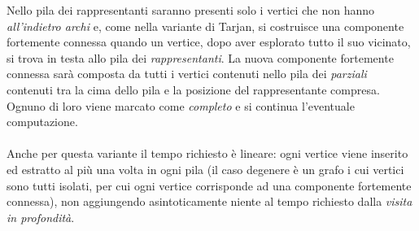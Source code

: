 Nello pila dei rappresentanti saranno presenti solo i vertici che non
hanno \emph{all'indietro archi} e, come nella variante di Tarjan, si
costruisce una componente fortemente connessa quando un vertice, dopo
aver esplorato tutto il suo vicinato, si trova in testa allo pila dei
\emph{rappresentanti}. La nuova componente fortemente connessa sar\`a
composta da tutti i vertici contenuti nello pila dei \emph{parziali}
contenuti tra la cima dello pila e la posizione del rappresentante
compresa. Ognuno di loro viene marcato come \emph{completo} e si
continua l'eventuale computazione.
\\\\
Anche per questa variante il tempo richiesto \`e lineare: ogni vertice
viene inserito ed estratto al pi\`u una volta in ogni pila (il caso
degenere \`e un grafo i cui vertici sono tutti isolati, per cui ogni
vertice corrisponde ad una componente fortemente connessa), non
aggiungendo asintoticamente niente al tempo richiesto dalla
\emph{visita in profondit\`a}.




